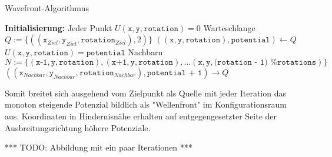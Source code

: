 \begin{algorithm}
\caption{Wavefront-Algorithmus}
\begin{algorithmic}[1]
    \State \textbf{Initialisierung:}
    \State \hspace{\algorithmicindent} Jeder Punkt $U(\texttt{x}, \texttt{y}, \texttt{rotation}) = 0$
    \State \hspace{\algorithmicindent} Warteschlange $Q := \{((\texttt{x}_{Ziel}, \texttt{y}_{Ziel}, \texttt{rotation}_{Ziel}), 2)\}$
	\vspace*{0.5cm}
        \State $((\texttt{x}, \texttt{y}, \texttt{rotation}), \texttt{potential}) \gets Q$
        \State $U(\texttt{x}, \texttt{y}, \texttt{rotation}) = \texttt{potential}$
        \State Nachbarn $N := \{(\texttt{x-1}, \texttt{y}, \texttt{rotation}), (\texttt{x+1}, \texttt{y}, \texttt{rotation}), ... (\texttt{x}, \texttt{y}, \texttt{(rotation - 1) \% rotations})\}$
                \State $((\texttt{x}_{Nachbar}, \texttt{y}_{Nachbar}, \texttt{rotation}_{Nachbar}), \texttt{potential + 1}) \rightarrow Q$
            \EndIf
        \EndFor
    \EndWhile
\end{algorithmic}
\end{algorithm}

Somit breitet sich ausgehend vom Zielpunkt als Quelle mit jeder Iteration das monoton steigende Potenzial bildlich als "Wellenfront" im Konfigurationsraum aus.
Koordinaten in Hindernisnähe erhalten auf entgegengesetzter Seite der Ausbreitungsrichtung höhere Potenziale.

*** TODO: Abbildung mit ein paar Iterationen ***



